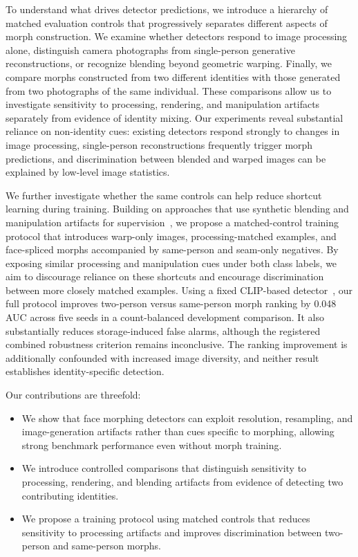 \documentclass[10pt,twocolumn,letterpaper]{article}
\begin{document}
To understand what drives detector predictions, we introduce a hierarchy of matched evaluation controls that progressively separates different aspects of morph construction. We examine whether detectors respond to image processing alone, distinguish camera photographs from single-person generative reconstructions, or recognize blending beyond geometric warping. Finally, we compare morphs constructed from two different identities with those generated from two photographs of the same individual. These comparisons allow us to investigate sensitivity to processing, rendering, and manipulation artifacts separately from evidence of identity mixing. Our experiments reveal substantial reliance on non-identity cues: existing detectors respond strongly to changes in image processing, single-person reconstructions frequently trigger morph predictions, and discrimination between blended and warped images can be explained by low-level image statistics.

We further investigate whether the same controls can help reduce shortcut learning during training. Building on approaches that use synthetic blending and manipulation artifacts for supervision~\cite{li2020facexray,shiohara2022sbi}, we propose a matched-control training protocol that introduces warp-only images, processing-matched examples, and face-spliced morphs accompanied by same-person and seam-only negatives. By exposing similar processing and manipulation cues under both class labels, we aim to discourage reliance on these shortcuts and encourage discrimination between more closely matched examples. Using a fixed CLIP-based detector~\cite{radford2021clip,hu2022lora}, our full protocol improves two-person versus same-person morph ranking by 0.048 AUC across five seeds in a count-balanced development comparison. It also substantially reduces storage-induced false alarms, although the registered combined robustness criterion remains inconclusive. The ranking improvement is additionally confounded with increased image diversity, and neither result establishes identity-specific detection.

Our contributions are threefold:
\begin{itemize}
    \item We show that face morphing detectors can exploit resolution, resampling, and image-generation artifacts rather than cues specific to morphing, allowing strong benchmark performance even without morph training.

    \item We introduce controlled comparisons that distinguish sensitivity to processing, rendering, and blending artifacts from evidence of detecting two contributing identities.

    \item We propose a training protocol using matched controls that reduces sensitivity to processing artifacts and improves discrimination between two-person and same-person morphs.
\end{itemize}
\end{document}
